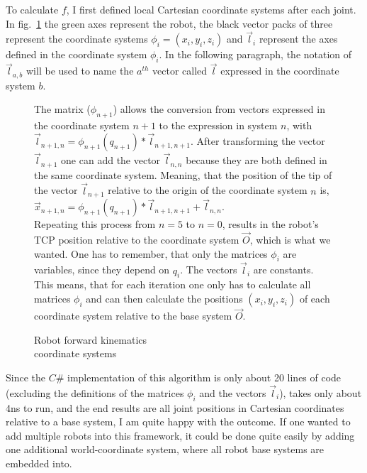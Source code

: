 To calculate $f$, I first defined local Cartesian coordinate systems after each joint. In fig.~\ref{Fig:ForwardKinematics} the green axes represent the robot, the black vector packs of three represent the coordinate systems $\phi_i = (x_i, y_i, z_i)$ and $\vec{l}_i$ represent the axes defined in the coordinate system $\phi_i$. In the following paragraph, the notation of  $\vec{l}_{a,b}$ will be used to name the $a^{th}$ vector called $\vec{l}$ expressed in the coordinate system $b$.

\begin{figure}[!h]
	\begin{minipage}{0.45\textwidth}
		\centering
		
		\caption{Robot forward kinematics\\coordinate systems}
		\label{Fig:ForwardKinematics}
	\end{minipage}\hfill
	\begin{minipage}{0.45\textwidth}
		The matrix ($\phi_{n+1}$) allows the conversion from vectors expressed in the coordinate system $n + 1$ to the expression in system $n$, with $\vec{l}_{n+1,n} = \phi_{n+1}(q_{n+1}) * \vec{l}_{n+1,n+1}$. After transforming the vector $\vec{l}_{n+1}$ one can add the vector $\vec{l}_{n,n}$ because they are both defined in the same coordinate system. Meaning, that the position of the tip of the vector $\vec{l}_{n+1}$ relative to the origin of the coordinate system $n$ is, $\vec{x}_{n+1,n} = \phi_{n+1}(q_{n+1}) * \vec{l}_{n+1,n+1} + \vec{l}_{n,n} $.\\
		Repeating this process from $n = 5$ to $n = 0$, results in the robot's TCP position relative to the coordinate system $\vec{O}$, which is what we wanted. One has to remember, that only the matrices $\phi_{i}$ are variables, since they depend on $q_i$. The vectors $\vec{l}_i$ are constants. This means, that for each iteration one only has to calculate all matrices $\phi_i$ and can then calculate the positions $(x_i, y_i, z_i)$ of each coordinate system relative to the base system $\vec{O}$.
	\end{minipage}
\end{figure}

\FloatBarrier

Since the $C\#$ implementation of this algorithm is only about 20 lines of code (excluding the definitions of the matrices $\phi_i$ and the vectors $\vec{l}_i$), takes only about 4ns to run, and the end results are all joint positions in Cartesian coordinates relative to a base system, I am quite happy with the outcome. If one wanted to add multiple robots into this framework, it could be done quite easily by adding one additional world-coordinate system, where all robot base systems are embedded into.
	

